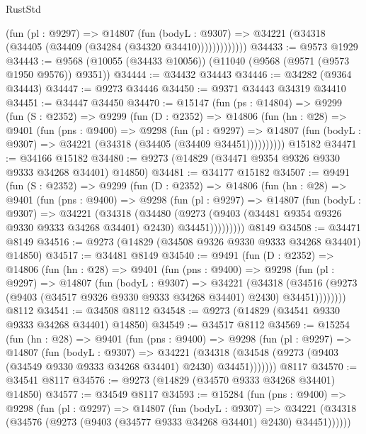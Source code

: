 \begin{lexlean}{RustStd}
\begin{coremodule}
                (fun (pl : @9297) =>
                @14807
                  (fun (bodyL : @9307) =>
                  @34221 (@34318 (@34405 (@34409 (@34284 (@34320 @34410)))))))))))))
@34433 := @9573 @1929
@34443 := @9568 (@10055 (@34433 @10056)) (@11040 (@9568 (@9571 (@9573 @1950 @9576)) @9351))
@34444 := @34432 @34443
@34446 := @34282 (@9364 @34443)
@34447 := @9273 @34446
@34450 := @9371 @34443 @34319 @34410
@34451 := @34447 @34450
@34470 := @15147
    (fun (ps : @14804) =>
    @9299
      (fun (S : @2352) =>
      @9299
        (fun (D : @2352) =>
        @14806
          (fun (hn : @28) =>
          @9401
            (fun (pns : @9400) =>
            @9298
              (fun (pl : @9297) =>
              @14807 (fun (bodyL : @9307) => @34221 (@34318 (@34405 (@34409 @34451))))))))))
    @15182
@34471 := @34166 @15182
@34480 := @9273 (@14829 (@34471 @9354 @9326 @9330 @9333 @34268 @34401) @14850)
@34481 := @34177 @15182
@34507 := @9491
    (fun (S : @2352) =>
    @9299
      (fun (D : @2352) =>
      @14806
        (fun (hn : @28) =>
        @9401
          (fun (pns : @9400) =>
          @9298
            (fun (pl : @9297) =>
            @14807
              (fun (bodyL : @9307) =>
              @34221
                (@34318
                  (@34480
                    (@9273
                      (@9403 (@34481 @9354 @9326 @9330 @9333 @34268 @34401) @2430)
                      @34451)))))))))
    @8149
@34508 := @34471 @8149
@34516 := @9273 (@14829 (@34508 @9326 @9330 @9333 @34268 @34401) @14850)
@34517 := @34481 @8149
@34540 := @9491
    (fun (D : @2352) =>
    @14806
      (fun (hn : @28) =>
      @9401
        (fun (pns : @9400) =>
        @9298
          (fun (pl : @9297) =>
          @14807
            (fun (bodyL : @9307) =>
            @34221
              (@34318
                (@34516 (@9273 (@9403 (@34517 @9326 @9330 @9333 @34268 @34401) @2430) @34451))))))))
    @8112
@34541 := @34508 @8112
@34548 := @9273 (@14829 (@34541 @9330 @9333 @34268 @34401) @14850)
@34549 := @34517 @8112
@34569 := @15254
    (fun (hn : @28) =>
    @9401
      (fun (pns : @9400) =>
      @9298
        (fun (pl : @9297) =>
        @14807
          (fun (bodyL : @9307) =>
          @34221
            (@34318 (@34548 (@9273 (@9403 (@34549 @9330 @9333 @34268 @34401) @2430) @34451)))))))
    @8117
@34570 := @34541 @8117
@34576 := @9273 (@14829 (@34570 @9333 @34268 @34401) @14850)
@34577 := @34549 @8117
@34593 := @15284
    (fun (pns : @9400) =>
    @9298
      (fun (pl : @9297) =>
      @14807
        (fun (bodyL : @9307) =>
        @34221 (@34318 (@34576 (@9273 (@9403 (@34577 @9333 @34268 @34401) @2430) @34451))))))

\end{coremodule}
\end{lexlean}
